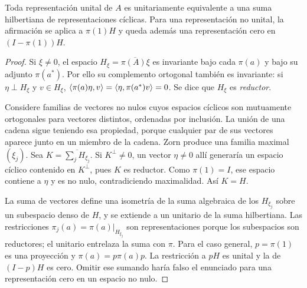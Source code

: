 \begin{teorema}\label{v3:descomposicion-ciclica}
Toda representación unital de $A$ es unitariamente equivalente a una suma hilbertiana de representaciones cíclicas. Para una representación no unital, la afirmación se aplica a $\pi(1)H$ y queda además una representación cero en $(I-\pi(1))H$.
\end{teorema}
\begin{proof}
Si $\xi\ne0$, el espacio $H_\xi=\overline{\pi(A)\xi}$ es invariante bajo cada $\pi(a)$ y bajo su adjunto $\pi(a^*)$. Por ello su complemento ortogonal también es invariante: si $\eta\perp H_\xi$ y $v\in H_\xi$, $\left\langle\pi(a)\eta,v\right\rangle=\left\langle\eta,\pi(a^*)v\right\rangle=0$. Se dice que $H_\xi$ es \emph{reductor}.

Considere familias de vectores no nulos cuyos espacios cíclicos son mutuamente ortogonales para vectores distintos, ordenadas por inclusión. La unión de una cadena sigue teniendo esa propiedad, porque cualquier par de sus vectores aparece junto en un miembro de la cadena. Zorn produce una familia maximal $(\xi_j)$. Sea $K=\overline{\sum_jH_{\xi_j}}$. Si $K^\perp\ne0$, un vector $\eta\ne0$ allí generaría un espacio cíclico contenido en $K^\perp$, pues $K$ es reductor. Como $\pi(1)=I$, ese espacio contiene a $\eta$ y es no nulo, contradiciendo maximalidad. Así $K=H$.

La suma de vectores define una isometría de la suma algebraica de los $H_{\xi_j}$ sobre un subespacio denso de $H$, y se extiende a un unitario de la suma hilbertiana. Las restricciones $\pi_j(a)=\pi(a)|_{H_{\xi_j}}$ son representaciones porque los subespacios son reductores; el unitario entrelaza la suma con $\pi$. Para el caso general, $p=\pi(1)$ es una proyección y $\pi(a)=p\pi(a)p$. La restricción a $pH$ es unital y la de $(I-p)H$ es cero. Omitir ese sumando haría falso el enunciado para una representación cero en un espacio no nulo.
\end{proof}

